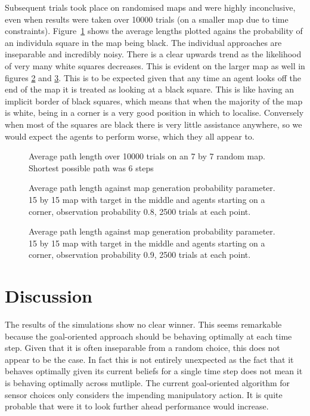 \documentclass{article}
\begin{document}
Subsequent trials took place on randomised maps and were highly inconclusive, even 
when results were taken over 10000 trials (on a smaller map due to time constraints).
Figure~\ref{fig:smallrand} shows the average lengths plotted agains the probability
of an individula square in the map being black. The individual approaches are 
inseparable and incredibly noisy. There is a clear upwards trend as the likelihood
of very many white squares decreases. This is evident on the larger map as well in
figures \ref{fig:random80} and \ref{fig:random90}. This is to be expected given that 
any time an agent looks off the end of the map it is treated as looking at a black 
square. This is like having an implicit border of black squares, which means that when
the majority of the map is white, being in a corner is a very good position in which to 
localise. Conversely when most of the squares are black there is very little assistance 
anywhere, so we would expect the agents to perform worse, which they all appear to.


\begin{figure}
	
	\caption{Average path length over 10000 trials on an 7 by 7 random map. Shortest 
	possible path was 6 steps}
	\label{fig:smallrand}
\end{figure}
\begin{figure}
	
	\caption{Average path length against map generation probability parameter. 
	15 by 15 map with target in the middle and agents starting on a corner,
	observation probability 0.8, 2500 trials at each point.}
	\label{fig:random80}
\end{figure}
\begin{figure}
	
	\caption{Average path length against map generation probability parameter. 
	15 by 15 map with target in the middle and agents starting on a corner,
	observation probability 0.9, 2500 trials at each point.}
	\label{fig:random90}
\end{figure}

\section{Discussion}
The results of the simulations show no clear winner. This seems remarkable because the 
goal-oriented approach should be behaving optimally at each time step. Given that it is 
often inseparable from a random choice, this does not appear to be the case. In fact this
is not entirely unexpected as the fact that it behaves optimally given its current 
beliefs for a single time step does not mean it is behaving optimally across mutliple.
The current goal-oriented algorithm for sensor choices only considers the impending 
manipulatory action. It is quite probable that were it to look further ahead performance
would increase.
\end{document}
